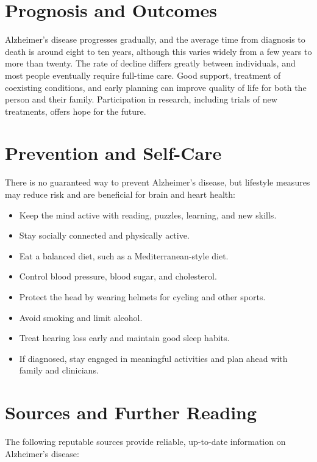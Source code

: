 \section*{Prognosis and Outcomes}
Alzheimer's disease progresses gradually, and the average time from diagnosis to death is around eight to ten years, although this varies widely from a few years to more than twenty. The rate of decline differs greatly between individuals, and most people eventually require full-time care. Good support, treatment of coexisting conditions, and early planning can improve quality of life for both the person and their family. Participation in research, including trials of new treatments, offers hope for the future.

\section*{Prevention and Self-Care}
There is no guaranteed way to prevent Alzheimer's disease, but lifestyle measures may reduce risk and are beneficial for brain and heart health:

\begin{itemize}
    \item Keep the mind active with reading, puzzles, learning, and new skills.
    \item Stay socially connected and physically active.
    \item Eat a balanced diet, such as a Mediterranean-style diet.
    \item Control blood pressure, blood sugar, and cholesterol.
    \item Protect the head by wearing helmets for cycling and other sports.
    \item Avoid smoking and limit alcohol.
    \item Treat hearing loss early and maintain good sleep habits.
    \item If diagnosed, stay engaged in meaningful activities and plan ahead with family and clinicians.
\end{itemize}

\section*{Sources and Further Reading}
The following reputable sources provide reliable, up-to-date information on Alzheimer's disease:

